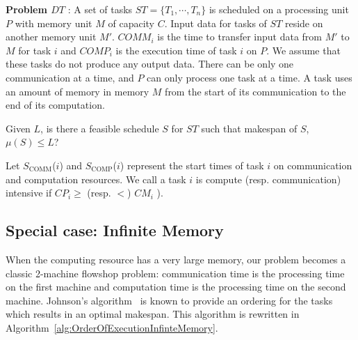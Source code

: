 \documentclass[sigconf]{acmart}
\newcommand{\scomm}{\ensuremath{{S}_{\text{COMM}}}}
\newcommand{\scomp}{\ensuremath{{S}_{\text{COMP}}}}
\begin{document}
	\noindent\textbf{Problem $DT$} : A set of tasks $ST=\{T_1,
	\cdots, T_n\}$ is scheduled on a processing unit $P$ with
	memory unit $M$ of capacity $C$. Input data for tasks of $ST$
	reside on another memory unit $M'$. $COMM_i$ is the time to
	transfer input data from $M'$ to $M$ for task $i$ and $COMP_i$
	is the execution time of task $i$ on $P$. We assume that these
	tasks do not produce any output data. There can be only one
	communication at a time, and $P$ can only process one task at
	a time. A task uses an amount of memory in memory $M$ from the
	start of its communication to the end of its computation.
	
	\noindent Given $L$, is there a feasible schedule $S$ for $ST$ such that
	makespan of $S$, $\mu(S) \le L$?
	

Let \scomm($i$) and  \scomp($i$) represent the start times of task $i$ on communication and computation resources. We call a task $i$ is compute (resp. communication) intensive if $CP_i $$\ge$ (resp. $<$) $CM_i$ ).
	
	
	
	\subsection{Special case: Infinite Memory}
	
	When the computing resource has a very large memory, our problem
	becomes a classic 2-machine flowshop problem: communication time is
	the processing time on the first machine and computation time is the
	processing time on the second machine. Johnson's
	algorithm~\cite{johnson} is known to provide an ordering for the tasks
	which results in an optimal makespan. This algorithm is rewritten in
	Algorithm~\ref{alg:OrderOfExecutionInfinteMemory}.
	
\end{document}
